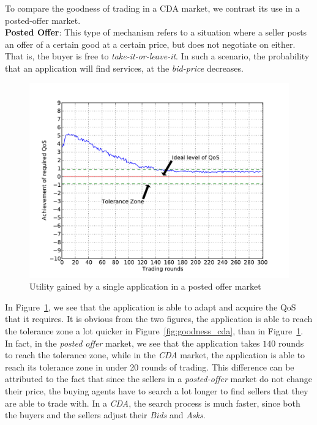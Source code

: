 \documentclass[10pt,journal,compsoc]{IEEEtran}
\begin{document}
To compare the goodness of trading in a CDA market, we contrast its use in a posted-offer market.\\
\textbf{Posted Offer}: This type of mechanism refers to a situation where a seller posts an offer of a certain good at a certain price, but does not negotiate on either. That is, the buyer is free to \textit{take-it-or-leave-it}.  In such a scenario, the probability that an application will find services, at the \textit{bid-price} decreases. 

\begin{figure}[h]
	\centering
	\includegraphics[scale=0.45]{graphs/posted_offer_singleapp_bimodal_qa.pdf}
	\caption{Utility gained by a single application in a posted offer market \label{fig:goodness_posted_offer}}
\end{figure}

In Figure~\ref{fig:goodness_posted_offer}, we see that the application is able to adapt and acquire the QoS that it requires. It is obvious from the two figures, the application is able to reach the tolerance zone a lot quicker in Figure~\ref{fig:goodness_cda}, than in Figure~\ref{fig:goodness_posted_offer}. In fact, in the \textit{posted offer} market, we see that the application takes $140$ rounds to reach the tolerance zone, while in the \textit{CDA} market, the application is able to reach its tolerance zone in under 20 rounds of trading. This difference can be attributed to the fact that since the sellers in a \textit{posted-offer} market do not change their price, the buying agents have to search a lot longer to find sellers that they are able to trade with. In a \textit{CDA}, the search process is much faster, since both the buyers and the sellers adjust their \textit{Bids} and \textit{Asks}.
\end{document}
